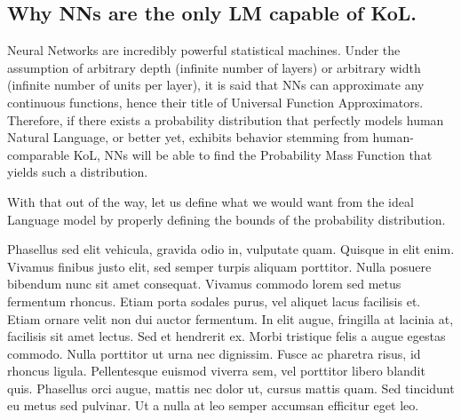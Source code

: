 \subsection*{Why NNs are the only LM capable of KoL.}

Neural Networks are incredibly powerful statistical machines.  Under the assumption of arbitrary depth (infinite number of layers) or arbitrary width (infinite number of units per layer), it is said that NNs can approximate any continuous functions, hence their title of Universal Function Approximators.  Therefore, if there exists a probability distribution that perfectly models human Natural Language, or better yet, exhibits behavior stemming from human-comparable KoL, NNs will be able to find the Probability Mass Function that yields such a distribution.

With that out of the way, let us define what we would want from the ideal Language model by properly defining the bounds of the probability distribution.





Phasellus sed elit vehicula, gravida odio in, vulputate quam. Quisque in elit enim. Vivamus finibus justo elit, sed semper turpis aliquam porttitor. Nulla posuere bibendum nunc sit amet consequat. Vivamus commodo lorem sed metus fermentum rhoncus. Etiam porta sodales purus, vel aliquet lacus facilisis et. Etiam ornare velit non dui auctor fermentum. In elit augue, fringilla at lacinia at, facilisis sit amet lectus. Sed et hendrerit ex. Morbi tristique felis a augue egestas commodo. Nulla porttitor ut urna nec dignissim. Fusce ac pharetra risus, id rhoncus ligula. Pellentesque euismod viverra sem, vel porttitor libero blandit quis. Phasellus orci augue, mattis nec dolor ut, cursus mattis quam. Sed tincidunt eu metus sed pulvinar. Ut a nulla at leo semper accumsan efficitur eget leo.

